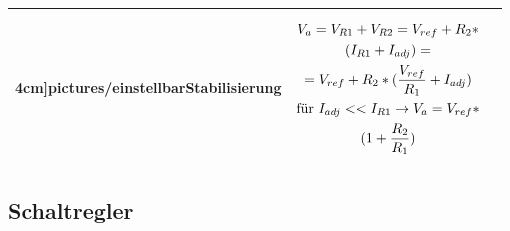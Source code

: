 \begin{longtable}{|l|l|l|}
\begin{minipage}{6cm}
4cm]{pictures/einstellbarStabilisierung}
\end{minipage}
&
\begin{minipage}{8cm}
\begin{gather}
V_{a}=V_{R1}+V_{R2}=V_{ref}+R_{2}*\notag\\*(I_{R1}+I_{adj})=\notag\\=V_{ref}+R_{2}*(\frac{V_{ref}}{R_{1}}+I_{adj})\\
\text{für }I_{adj}<< I_{R1} \to V_{a}=V_{ref}*\notag\\*(1+\frac{R_{2}}{R_{1}})
\end{gather}
\end{minipage}
\\
\hline
\end{longtable}

\subsection{Schaltregler} 
